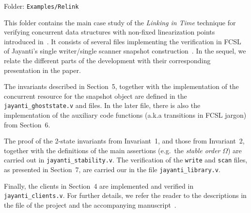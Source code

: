 Folder: \texttt{Examples/Relink}

This folder contains the main case study of the {\it Linking in Time}
technique for verifying concurrent data structures with non-fixed
linearization points introduced in~\cite{Delbianco-al:ECOOP17}. It
consists of several files implementing the verification in FCSL of
Jayanti's single writer/single scanner snapshot
construction~\cite{Jayanti+STOC05}. In the sequel, we relate the
different parts of the development with their corresponding
presentation in the paper.

The invariants described in Section~5, together with the
implementation of the concurrent resource for the snapshot object are
defined in the \texttt{jayanti\_ghoststate.v} and
 files. In the later file, there is also
the implementation of the auxiliary code functions (a.k.a transitions
in FCSL jargon) from Section~6.

The proof of the 2-state invariants from Invariant~1, and those from
Invariant~2, together with the definitions of the main assertions
(e.g.\ the {\it stable order} $\Omega$) are carried out in
\texttt{jayanti\_stability.v}. The verification of the \texttt{write}
and \texttt{scan} files, as presented in Section~7, are carried our in
the file \texttt{jayanti\_library.v}.

Finally, the clients in Section~4 are implemented and verified in
\texttt{jayanti\_clients.v}. For further details, we refer the reader
to the descriptions in the  file of the project and
the accompanying manuscript~\cite{Delbianco-al:ECOOP17}.
